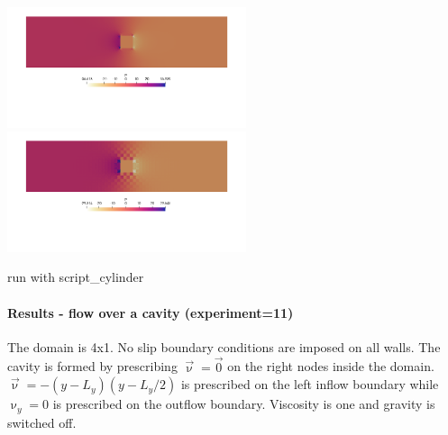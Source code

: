 \begin{center}
\includegraphics[width=7cm]{python_codes/fieldstone_78/results/cylinder/p6}
\includegraphics[width=7cm]{python_codes/fieldstone_78/results/cylinder/p7}
\end{center}

run with script\_cylinder

\newpage
\paragraph{Results - flow over a cavity (experiment=11)}

The domain is 4x1. No slip boundary conditions are imposed on all walls.
The cavity is formed by prescribing $\vec{\upnu}=\vec{0}$ on the right
nodes inside the domain. $\vec{\upnu}=-(y-L_y)(y-L_y/2)$ is prescribed 
on the left inflow boundary while $\upnu_y=0$ is prescribed on the outflow boundary.
Viscosity is one and gravity is switched off.
 

